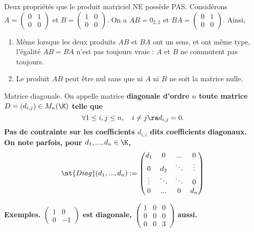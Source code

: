 \documentclass[11pt]{article}
\begin{document}
\begin{ex}{Deux propriétés que le produit matriciel NE possède PAS.}{}
    Considérons $A=\begin{pmatrix}0&1\\0&0\end{pmatrix}$ et $B=\begin{pmatrix}1&0\\0&0\end{pmatrix}$. On a $AB=0_{2,2}$ et $BA=\begin{pmatrix}0&1\\0&0\end{pmatrix}$. Ainsi,
    \begin{enumerate}
        \item Même lorsque les deux produits $AB$ et $BA$ ont un sens, et ont même type, l'égalité $AB=BA$ n'est pas toujours vraie : $A$ et $B$ ne commutent pas toujours.
        \item Le produit $AB$ peut être nul sans que ni $A$ ni $B$ ne soit la matrice nulle.
    \end{enumerate}
\end{ex}

\begin{defi}{Matrice diagonale.}{}
    On appelle matrice \bf{diagonale} d'ordre $n$ toute matrice $D=(d_{i,j})\in M_n(\K)$ telle que
    \begin{equation*}
        \forall 1 \leq i,j \leq n, \quad i \neq j \ra d_{i,j}=0.
    \end{equation*}
    Pas de contrainte sur les coefficients $d_{i,i}$ dits coefficients diagonaux.\\
    On note parfois, pour $d_1,...,d_n\in\K$,
    \begin{equation*}
        \nt{Diag}(d_1,...,d_n):=\begin{pmatrix}
            d_1&0&...&0\\
            0&d_2&\ddots&\vdots\\
            \vdots&\ddots&\ddots&0\\
            0&...&0&d_n
        \end{pmatrix}
    \end{equation*}
\end{defi}
\bf{Exemples.} $\begin{pmatrix}1&0\\0&-1\end{pmatrix}$ est diagonale, $\begin{pmatrix}1&0&0\\0&0&0\\0&0&3\end{pmatrix}$ aussi.
\end{document}
